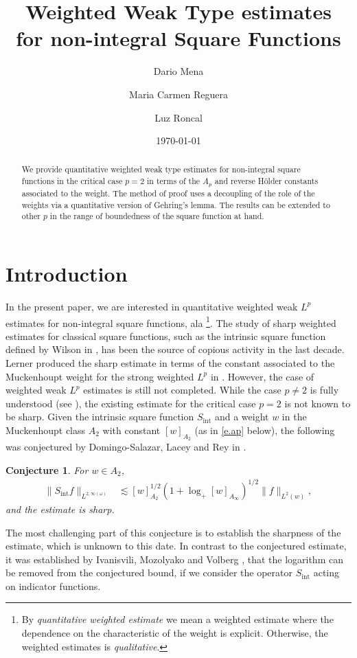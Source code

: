 \documentclass[11pt,reqno]{amsart}
\date{\today}
\title[] {Weighted Weak Type estimates\\ for non-integral Square Functions}
\author{Dario Mena}
\author{Maria Carmen Reguera}
\author{Luz Roncal}
\theoremstyle{plain} %
\newtheorem{conjecture}[equation]{Conjecture}
\newcommand{\1}{ \mathbbm{1}}   %
\theoremstyle{definition}
\theoremstyle{remark}
\numberwithin{equation}{section}
\begin{document}
\begin{abstract} 
We provide quantitative weighted weak type estimates for non-integral square functions in the critical case $p=2$ in terms of the $A_p$ and reverse H\"older constants associated to the weight. The method of proof uses a decoupling of the role of the weights via a quantitative version of Gehring's lemma. The results can be extended to other $p$ in the range of boundedness of the square function at hand. 
\end{abstract}


\maketitle 



\section{Introduction} %
\label{sec:introduction}



In the present paper, we are interested in quantitative weighted weak $L^p$ estimates for non-integral square functions, ala \cite{AM3}\footnote{By \textit{quantitative weighted estimate} we mean a weighted estimate where the dependence on the characteristic of the weight is explicit. Otherwise, the weighted estimates is \textit{qualitative}.}. The study of sharp weighted estimates for classical square functions, such as the intrinsic square function defined by Wilson in \cites{MR2414491, MR2359017}, has been the source of copious activity in the last decade. Lerner produced the sharp estimate in terms of the constant associated to the Muckenhoupt weight for the strong weighted $L^p$ in \cite{MR2770437}. However, the case of weighted weak $L^p$ estimates is still not completed. While the case $p\neq 2$ is fully understood (see \cites{MR3778152, DLR}), the existing estimate for the critical case $p=2$ is not known to be sharp. Given the intrinsic square function $S_{\operatorname{int}}$ and a weight $w$ in the Muckenhoupt class $A_2$ with constant $ [w]_{A_2}$ (as in \eqref{e.ap} below), the following was conjectured by Domingo-Salazar, Lacey and Rey in \cite{DLR}.
\begin{conjecture} \label{c.weak2}
For $w\in A_2$,
    \begin{align}
\lVert S_{\operatorname{int}}f \rVert_{L^{2,\infty (\omega)}} &\lesssim  [w]_{A_2}^{1/2} \left (1 + \log_{+}[w]_{A_{\infty}} \right )^{1/2} \lVert f \rVert_{L^2 (w)},
\end{align}
and the estimate is sharp.
\end{conjecture}
The most challenging part of this conjecture is to establish the sharpness of the estimate, which is unknown to this date. In contrast to the conjectured estimate, it was established by Ivanisvili, Mozolyako and Volberg  \cite{ivanisvili2022strong}, that the logarithm can be removed from the conjectured bound, if we consider the operator $S_{\operatorname{int}}$ acting on indicator functions.
\end{document}
